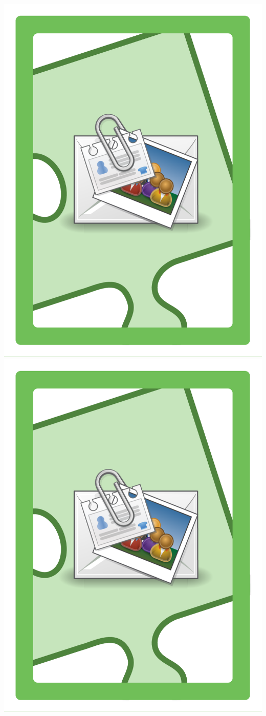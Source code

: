 \documentclass{letter}
\begin{document}
\includegraphics{lo0t/lo0t.shares_pii}
\includegraphics{lo0t/lo0t.shares_pii}
\end{document}
